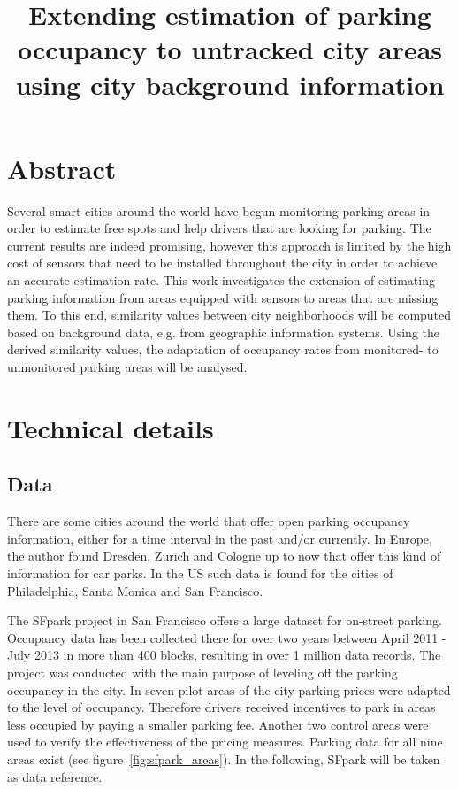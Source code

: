 \documentclass{article}
\begin{document}
\begin{large}

\title{Extending estimation of parking occupancy to untracked city areas using city background information}
\maketitle

\section{Abstract} 
Several smart cities around the world have begun monitoring parking areas in order to estimate free spots and help drivers that are looking for parking. The current results are indeed promising, however this approach is limited by the high cost of sensors that need to be installed throughout the city in order to achieve an accurate estimation rate. This work in\-ves\-ti\-gates the extension of estimating parking information from areas equipped with sensors to areas that are mis\-sing them. To this end, si\-mi\-la\-ri\-ty va\-lues between city neighborhoods will be computed based on background data, e.g. from geographic information systems. Using the derived si\-mi\-la\-ri\-ty va\-lues, the adaptation of occupancy rates from monitored- to unmonitored parking areas will be analysed.

\section{Technical details}
\subsection{Data}
There are some cities around the world that offer open parking occupancy information, either for a time interval in the past and/or currently. In Europe, the author found Dresden\cite{dresden}, Zurich\cite{zurich} and Cologne\cite{cologne} up to now that offer this kind of information for car parks. In the US such data is found for the cities of Philadelphia\cite{philly}, Santa Monica\cite{monica} and San Francisco\cite{sfpark}. 

The SFpark project in San Francisco offers a large dataset for on-street parking. Occupancy data has been collected there for over two years between April 2011 - July 2013 in more than 400 blocks, resulting in over 1 million data records. The project was conducted with the main purpose of leveling off the parking occupancy in the city. In seven pilot areas of the city parking prices were adapted to the level of occupancy. Therefore drivers received incentives to park in areas less occupied by paying a smaller parking fee. Another two control areas were used to verify the effectiveness of the pricing measures. Parking data for all nine areas exist (see figure~\ref{fig:sfpark_areas}). In the following, SFpark will be taken as data reference.


\end{large}
\end{document}
